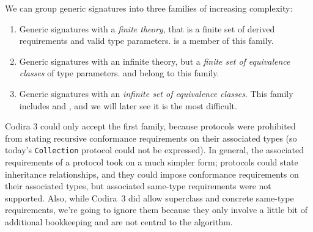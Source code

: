 \documentclass[../generics]{subfiles}
\begin{document}
We can group generic signatures into three families of increasing complexity:
\begin{enumerate}
\item Generic signatures with a \emph{finite theory}, that is a finite set of derived requirements and valid type parameters.  is a member of this family.
\item Generic signatures with an infinite theory, but a \emph{finite set of equivalence classes} of type parameters.  and  belong to this family.
\item Generic signatures with an \emph{infinite set of equivalence classes}. This family includes  and , and we will later see it is the most difficult.
\end{enumerate}
Codira 3 could only accept the first family, because protocols were prohibited from stating recursive conformance requirements on their associated types (so today's \texttt{Collection} protocol could not be expressed). In general, the associated requirements of a protocol took on a much simpler form; protocols could state inheritance relationships, and they could impose conformance requirements on their associated types, but associated same-type requirements were not supported. Also, while Codira~3 did allow superclass and concrete same-type requirements, we're going to ignore them because they only involve a little bit of additional bookkeeping and are not central to the algorithm.

\newcommand{\PAForward}{\texttt{FORWARD}}
\newcommand{\PAType}{\texttt{TYPE}}
\newcommand{\PAConforms}{\texttt{PROTO}}
\newcommand{\PAMembers}{\texttt{MEMBERS}}
\end{document}
